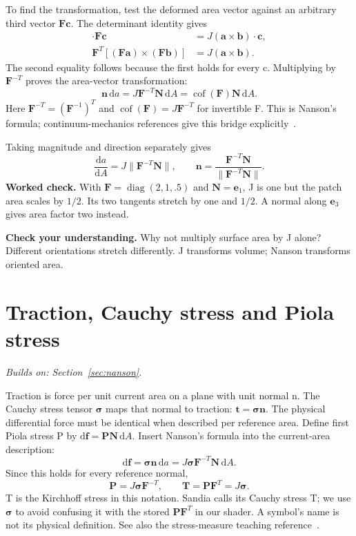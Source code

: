 \documentclass[11pt,a4paper]{article}
\newcommand{\mat}[1]{\mathbf{#1}}
\newcommand{\prereq}[1]{\textit{Builds on: #1}\par}
\newcommand{\checkpoint}[1]{\par\textbf{Check your understanding.} #1\par}
\DeclareMathOperator{\diag}{diag}
\DeclareMathOperator{\cof}{cof}
\numberwithin{equation}{section}
\begin{document}
To find the transformation, test the deformed area vector against an arbitrary
third vector $\mat F\mat c$. The determinant identity gives
\begin{align*}
[(\mat F\mat a)\times(\mat F\mat b)]\cdot\mat F\mat c
&=J(\mat a\times\mat b)\cdot\mat c,\\
\mat F^T[(\mat F\mat a)\times(\mat F\mat b)]
&=J(\mat a\times\mat b).
\end{align*}
The second equality follows because the first holds for every c. Multiplying
by $\mat F^{-T}$ proves the area-vector transformation:
\begin{equation}\label{eq:nanson}
\boxed{\mat n\,\mathrm da=J\mat F^{-T}\mat N\,\mathrm dA
=\cof(\mat F)\mat N\,\mathrm dA.}
\end{equation}
Here $\mat F^{-T}=(\mat F^{-1})^T$ and
$\cof(\mat F)=J\mat F^{-T}$ for invertible F. This is Nanson's formula;
continuum-mechanics references give this bridge explicitly~\cite{sandia,nptel}.

Taking magnitude and direction separately gives
\[
\frac{\mathrm da}{\mathrm dA}=J\|\mat F^{-T}\mat N\|,
\qquad
\mat n=\frac{\mat F^{-T}\mat N}{\|\mat F^{-T}\mat N\|}.
\]
\textbf{Worked check.} With $\mat F=\diag(2,1,.5)$ and $\mat N=\mat e_1$,
J is one but the patch area scales by $1/2$. Its two tangents stretch by one
and $1/2$. A normal along $\mat e_3$ gives area factor two instead.
\checkpoint{Why not multiply surface area by J alone? Different orientations
stretch differently. J transforms volume; Nanson transforms oriented area.}

\section{Traction, Cauchy stress and Piola stress}\label{sec:stress}
\prereq{Section~\ref{sec:nanson}.}
Traction is force per unit current area on a plane with unit normal n.
The Cauchy stress tensor $\boldsymbol\sigma$ maps that normal to traction:
$\mat t=\boldsymbol\sigma\mat n$.
The physical differential force must be identical when described per reference
area. Define first Piola stress P by $\mathrm d\mat f=\mat P\mat N\,\mathrm dA$.
Insert Nanson's formula into the current-area description:
\[
\mathrm d\mat f=\boldsymbol\sigma\mat n\,\mathrm da
=J\boldsymbol\sigma\mat F^{-T}\mat N\,\mathrm dA.
\]
Since this holds for every reference normal,
\begin{equation}\label{eq:piola}
\boxed{\mat P=J\boldsymbol\sigma\mat F^{-T}},\qquad
\boxed{\mat T=\mat P\mat F^T=J\boldsymbol\sigma}.
\end{equation}
T is the Kirchhoff stress in this notation. Sandia calls its Cauchy stress T;
we use $\boldsymbol\sigma$ to avoid confusing it with the stored
$\mat P\mat F^T$ in our shader. A symbol's name is not its physical definition.
See also the stress-measure teaching reference~\cite{alberta}.
\end{document}
